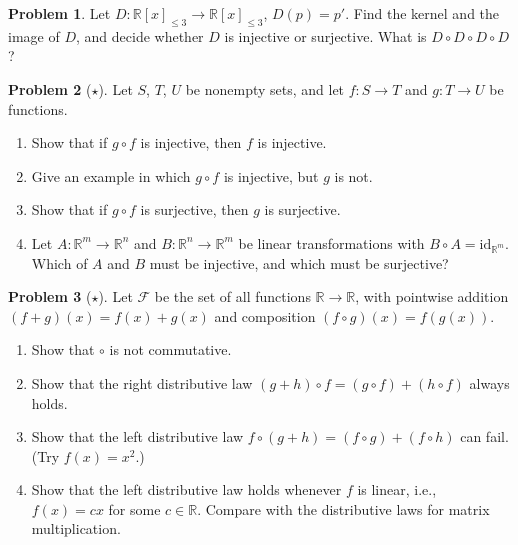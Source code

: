 \documentclass[11pt]{article}
\theoremstyle{definition}
\newtheorem{problem}{Problem}[section]
\begin{document}
\begin{problem}\label{pr:derivative}
    Let $D: \mathbb{R}[x]_{\leq 3} \to \mathbb{R}[x]_{\leq 3}$, $D(p) = p'$. Find the kernel and the image of $D$, and decide whether $D$ is injective or surjective. What is $D \circ D \circ D \circ D$?
\end{problem}

\begin{problem}[$\star$]\label{pr:composition}
    Let $S$, $T$, $U$ be nonempty sets, and let $f: S \to T$ and $g: T \to U$ be functions.
    \begin{enumerate}[label=(\alph*)]
        \item Show that if $g \circ f$ is injective, then $f$ is injective.
        \item Give an example in which $g \circ f$ is injective, but $g$ is not.
        \item Show that if $g \circ f$ is surjective, then $g$ is surjective.
        \item Let $A: \mathbb{R}^m \to \mathbb{R}^n$ and $B: \mathbb{R}^n \to \mathbb{R}^m$ be linear transformations with $B \circ A = \mathrm{id}_{\mathbb{R}^m}$. Which of $A$ and $B$ must be injective, and which must be surjective?
    \end{enumerate}
\end{problem}

\begin{problem}[$\star$]\label{pr:distributive}
    Let $\mathcal{F}$ be the set of all functions $\mathbb{R} \to \mathbb{R}$, with pointwise addition $(f + g)(x) = f(x) + g(x)$ and composition $(f \circ g)(x) = f(g(x))$.
    \begin{enumerate}[label=(\alph*)]
        \item Show that $\circ$ is not commutative.
        \item Show that the right distributive law $(g + h) \circ f = (g \circ f) + (h \circ f)$ always holds.
        \item Show that the left distributive law $f \circ (g + h) = (f \circ g) + (f \circ h)$ can fail. (Try $f(x) = x^2$.)
        \item Show that the left distributive law holds whenever $f$ is linear, i.e., $f(x) = cx$ for some $c \in \mathbb{R}$. Compare with the distributive laws for matrix multiplication.
    \end{enumerate}
\end{problem}
\end{document}
